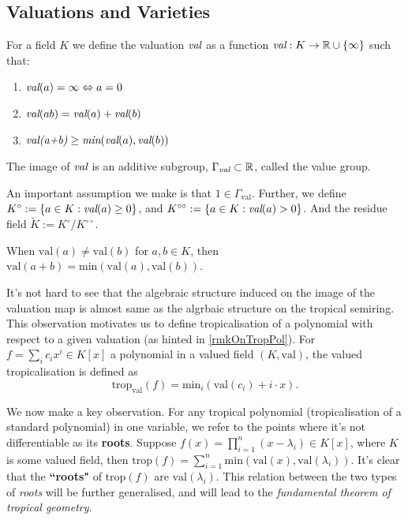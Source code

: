 \subsection{Valuations and Varieties}
    \begin{definition}
        For a field $K$ we define the valuation $\emph{val}$ as a function $\emph{val}: K \to \mathbb{R}\cup \{\infty\}$ such that:
        \begin{enumerate}
            \item $\emph{val}(a) = \infty \Leftrightarrow a = 0$
            \item $\emph{val}(ab) = \emph{val}(a)+ \emph{val}(b)$
            \item $\emph{val(a+b)} \geq \emph{min}(\emph{val}(a),\emph{val}(b))$
        \end{enumerate}
        The image of $\emph{val}$ is an additive subgroup, $\Gamma_{\emph{val}} \subset \mathbb{R}$, called the value group.
        \par An important assumption we make is that $1 \in \Gamma_{\text{val}}$. 
    Further, we define $K^{\circ} := \{a \in K: \emph{val}(a)\geq 0\}$, and $K^{\circ \circ} := \{a \in K: \emph{val}(a)> 0\}$. 
    And the residue field $\tilde{K} := K^{\circ}/K^{\circ \circ}$.
    \end{definition}

    \begin{lemma}
        \label{vallemma}
        When $\text{val}(a) \neq \text{val}(b)$ for $a,b \in K$, then $\text{val}(a+b)= \text{min}(\text{val}(a),\text{val}(b))$.
    \end{lemma}
    It's not hard to see that the algebraic structure induced on the image of the valuation map is almost same as the algrbaic structure on the tropical semiring. 
    This observation motivates us to define tropicalisation of a polynomial with respect to a given valuation (as hinted in \ref{rmkOnTropPol}).
    For $f = \sum_{i}c_{i}x^{i} \in K[x]$ a polynomial in a valued field $(K, \text{val})$, the valued tropicalisation is defined as
    \begin{equation*}
        \text{trop}_{\text{val}}(f) = \text{min}_{i}(\text{val}(c_{i}) + i \cdot x).
    \end{equation*}
    \begin{remark}
        \label{rootValRmk}
    We now make a key observation. For any tropical polynomial (tropicalisation of a standard polynomial) in one variable, we refer to the points where it's not differentiable as its \textbf{roots}. 
    Suppose $f(x) = \prod_{i=1}^{n}(x-\lambda_i) \in K[x]$, where $K$ is some valued field, then $\text{trop}(f) = \sum_{i=1}^{n}\text{min}(\text{val}(x),\text{val}(\lambda_i))$. 
    It's clear that the \textbf{``roots"} of $\text{trop}(f)$ are $\text{val}(\lambda_i)$.
    This relation between the two types of \textit{roots} will be further generalised, and will lead to the \textit{fundamental theorem of tropical geometry}.
    \end{remark}

